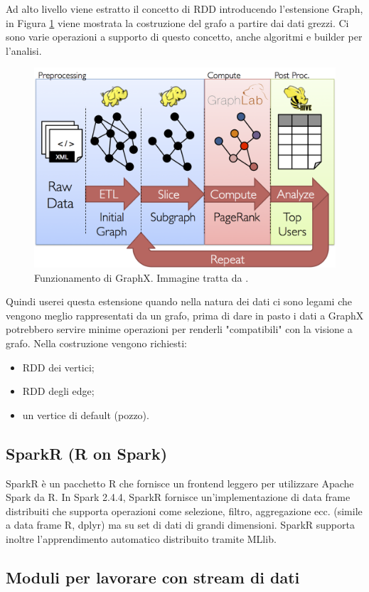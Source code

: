 \documentclass[12pt,italian]{article}
\begin{document}
Ad alto livello viene estratto il concetto di RDD introducendo l'estensione Graph, in Figura \ref{fig:GraphX} viene mostrata la costruzione del grafo a partire dai dati grezzi.
Ci sono varie operazioni a supporto di questo concetto, anche algoritmi e builder per l'analisi.
\begin{figure}[H]
	\centering 
	\includegraphics[width=0.8\linewidth]{img/graph_analytics_pipeline.png}
	\caption{Funzionamento di GraphX. Immagine tratta da \cite{spark}.}
	\label{fig:GraphX}
\end{figure}
Quindi userei questa estensione quando nella natura dei dati ci sono legami che vengono meglio rappresentati da un grafo,
prima di dare in pasto i dati a GraphX potrebbero servire minime operazioni per renderli "compatibili" con la visione a grafo.
Nella costruzione vengono richiesti:
\begin{itemize}
	\item RDD dei vertici;
	\item RDD degli edge;
	\item un vertice di default (pozzo).
\end{itemize}
\subsection{SparkR (R on Spark)}
SparkR è un pacchetto R che fornisce un frontend leggero per utilizzare Apache Spark da R. In Spark 2.4.4, SparkR fornisce un'implementazione di data frame distribuiti che supporta operazioni come selezione, filtro, aggregazione ecc. (simile a data frame R, dplyr) ma su set di dati di grandi dimensioni. SparkR supporta inoltre l'apprendimento automatico distribuito tramite MLlib.

\subsection{Moduli per lavorare con stream di dati}
\end{document}
